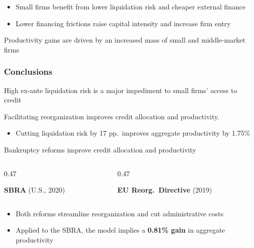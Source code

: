\documentclass[aspectratio=169,xcolor=table]{beamer}
\begin{document}
\begin{frame}[label=effects]
\begin{itemize} \small
    \item Small firms benefit from lower liquidation risk and cheaper external finance
    \item Lower financing frictions raise capital intensity and increase firm entry
\end{itemize}
Productivity gains are driven by an increased mass of small and middle-market firms

\end{frame}

 
\begin{frame}[label=conclusions2] \frametitle{Conclusions}
 
High ex-ante liquidation risk is a major impediment to small firms' access to credit \vspace{3mm}

Facilitating reorganization improves credit allocation and productivity. 
\begin{itemize} \small
    \item Cutting liquidation risk by 17 pp.\ improves aggregate productivity by 1.75\%
\end{itemize} \normalsize \vspace{5mm}

 
Bankruptcy reforms improve credit allocation and productivity \vspace{-4mm}
 
\begin{columns}[T,onlytextwidth]
\begin{column}{0.47\textwidth}
\begin{tcolorbox}[colback=lightblue,colframe=primary,boxrule=1pt,arc=1.5mm,left=2mm,right=2mm,top=0.8mm,bottom=0.8mm,halign=center]
\small \textbf{\textcolor{primary}{SBRA}} (U.S., 2020)
\end{tcolorbox}
\end{column}
\begin{column}{0.47\textwidth}
\begin{tcolorbox}[colback=lightblue,colframe=primary,boxrule=1pt,arc=1.5mm,left=2mm,right=2mm,top=0.8mm,bottom=0.8mm,halign=center]
\small \textbf{\textcolor{primary}{EU Reorg.\ Directive}} (2019)
\end{tcolorbox}
\end{column}
\end{columns}   \vspace{3mm}
\begin{itemize}
    \item Both reforms streamline reorganization and cut administrative costs
    \item Applied to the SBRA, the model implies a \textbf{\textcolor{primary}{0.81\% gain}} in aggregate productivity
\end{itemize} \normalsize
 
\end{frame}
\end{document}
